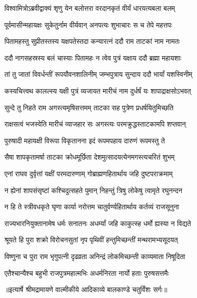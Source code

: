 \twolineshloka
{विश्वामित्रोऽब्रवीद्वाक्यं शृणु येन बलोत्तरा}
{वरदानकृतं वीर्यं धारयत्यबला बलम्} %

\twolineshloka
{पूर्वमासीन्महायक्षः सुकेतुर्नाम वीर्यवान्}
{अनपत्यः शुभाचारः स च तेपे महत्तपः} %

\twolineshloka
{पितामहस्तु सुप्रीतस्तस्य यक्षपतेस्तदा}
{कन्यारत्नं ददौ राम ताटकां नाम नामतः} %

\twolineshloka
{ददौ नागसहस्रस्य बलं चास्याः पितामहः}
{न त्वेव पुत्रं यक्षाय ददौ ब्रह्मा महायशाः} %

\twolineshloka
{तां तु जातां विवर्धन्तीं रूपयौवनशालिनीम्}
{जम्भपुत्राय सुन्दाय ददौ भार्यां यशस्विनीम्} %

\twolineshloka
{कस्यचित्त्वथ कालल्स्य यक्षी पुत्रं व्यजायत}
{मारीचं नाम दुर्धर्षं यः शापाद्राक्षसोऽभवत्} %

\twolineshloka
{सुन्दे तु निहते राम अगस्त्यमृषिसत्तमम्}
{ताटका सह पुत्रेण प्रधर्षयितुमिच्छति} %

\twolineshloka
{राक्षसत्वं भजस्वेति मारीचं व्याजहार सः}
{अगस्त्यः परमक्रुद्धस्ताटकामपि शप्तवान्} %

\twolineshloka
{पुरुषादी महायक्षी विरूपा विकृतानना}
{इदं रूपमपहाय दारुणं रूपमस्तु ते} %

\twolineshloka
{सैषा शापकृतामर्षा ताटका क्रोधमूर्छिता}
{देशमुत्सादयत्येनमगस्त्यचरितं शुभम्} %

\twolineshloka
{एनां राघव दुर्वृत्तां यक्षीं परमदारुणाम्}
{गोब्राह्मणहितार्थाय जहि दुष्टपराक्रमाम्} %

\twolineshloka
{न ह्येनां शापसंसृष्टां कश्चिदुत्सहते पुमान्}
{निहन्तुं त्रिषु लोकेषु त्वामृते रघुनन्दन} %

\twolineshloka
{न हि ते स्त्रीवधकृते घृणा कार्या नरोत्तम}
{चातुर्वर्ण्यहितार्थाय कर्तव्यं राजसूनुना} %

\twolineshloka
{राज्यभारनियुक्तानामेष धर्मः सनातनः}
{अधर्म्यां जहि काकुत्स्ह धर्मो ह्यस्या न विद्यते} %

\twolineshloka
{श्रूयते हि पुरा शक्रो विरोचनसुतां नृप}
{पृथिवीं हन्तुमिच्छन्तीं मन्थरामभ्यसूदयत्} %

\twolineshloka
{विष्णुना च पुरा राम भृगुपत्नी दृढव्रता}
{अनिन्द्रं लोकमिच्छन्ती काव्यमाता निषूदिता} %

\twolineshloka
{एतैश्चान्यैश्च बहुभी राजपुत्रमहात्मभिः}
{अधर्मनिरता नार्यो हताः पुरुषसत्तमैः} %


{॥इत्यार्षे श्रीमद्रामायणे वाल्मीकीये आदिकाव्ये बालकाण्डे चतुर्विंशः सर्गः॥}

